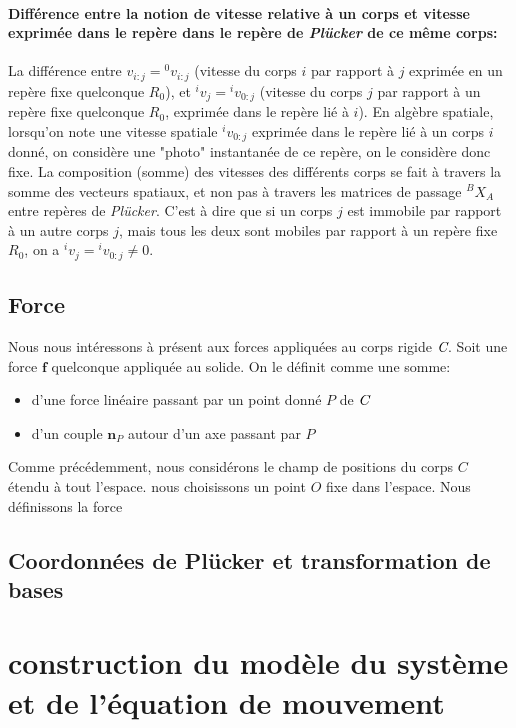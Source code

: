 \documentclass{report}
\begin{document}
\paragraph*{Différence entre la notion de vitesse relative à un corps et vitesse exprimée dans le repère dans le repère de \emph{Plücker} de ce même corps:} La différence entre $v_{i:j} = {^0v_{i:j}}$ (vitesse du corps $i$ par rapport à $j$ exprimée en un repère fixe quelconque $R_0$), et $^iv_j = {^iv_{0:j}}$ (vitesse du corps $j$ par rapport à un repère fixe quelconque $R_0$, exprimée dans le repère lié à $i$).
En algèbre spatiale, lorsqu'on note une vitesse spatiale ${^iv_{0:j}}$ exprimée dans le repère lié à un corps $i$ donné, on considère une "photo" instantanée de ce repère, on le considère donc fixe. La composition (somme) des vitesses des différents corps se fait à travers la somme des vecteurs spatiaux, et non pas à travers les matrices de passage $^BX_A$ entre repères de \emph{Plücker}. C'est à dire que si un corps $j$ est immobile par rapport à un autre corps $j$, mais tous les deux sont mobiles par rapport à un repère fixe $R_0$, on a ${^iv_j } = {^iv_{0:j}} \neq 0$.

\subsection{Force}

Nous nous intéressons à présent aux forces appliquées au corps rigide $\emph{C}$. Soit une force $\textbf{f}$ quelconque appliquée au solide. On le définit comme une somme:
\begin{itemize}
\item d'une force linéaire passant par un point donné $P$ de $\emph{C}$
\item d'un couple $\textbf{n}_{P}$ autour d'un axe passant par $P$
\end{itemize}

Comme précédemment, nous considérons le champ de positions du corps $C$ étendu à tout l'espace. nous choisissons un point $O$ fixe dans l'espace. Nous définissons la force 

\subsection{Coordonnées de Plücker et transformation de bases} \label{ch_algSpa_transformations}


\section{construction du modèle du système et de l'équation de mouvement} \label{ch_algSpa_equationMouvement}
\end{document}
